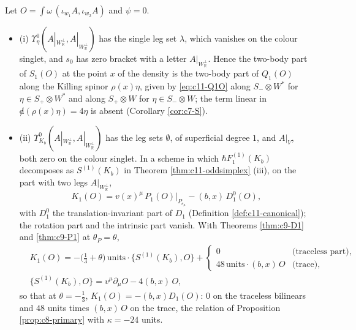 \begin{proposition}
\label{prop:c11-SKbil}
Let $O=\int\omega\,(\iota_{w_1}A,\iota_{w_2}A)$ and $\psi=0$.
\begin{itemize}
\item (i) $\Upsilon^0_\eta(A|_{W_{\mathbb R}^\perp},A|_{W_{\mathbb R}^\perp})$ has the single leg set $\lambda$, which vanishes on the colour singlet, and $s_0$ has zero bracket with a letter $A|_{W_{\mathbb R}^\perp}$. Hence the two-body part of $S_1(O)$ at the point $x$ of the density is the two-body part of $Q_1(O)$ along the Killing spinor $\rho(x)\eta$, given by \eqref{eq:c11-Q1O} along $S_-\otimes W^*$ for $\eta\in S_+\otimes W^*$ and along $S_+\otimes W$ for $\eta\in S_-\otimes W$; the term linear in ${\not d}(\rho(x)\eta)=4\eta$ is absent (Corollary \ref{cor:c7-S}).
\item (ii) $\Upsilon^0_{K_b}(A|_{W_{\mathbb R}^\perp},A|_{W_{\mathbb R}^\perp})$ has the leg sets $\emptyset$, of superficial degree $1$, and $A|_V$, both zero on the colour singlet. In a scheme in which $\hbar F_1^{(1)}(K_b)$ decomposes as $S^{(1)}(K_b)$ in Theorem \ref{thm:c11-oddsimplex} (iii), on the part with two legs $A|_{W_{\mathbb R}^\perp}$,
\[
K_1(O)=v(x)^\mu\,P_1(O)\big|_{P_{e_\mu}}-(b,x)\,D^0_1(O),
\]
with $D^0_1$ the translation-invariant part of $D_1$ (Definition \ref{def:c11-canonical}); the rotation part and the intrinsic part vanish. With Theorems \ref{thm:c9-D1} and \ref{thm:c9-P1} at $\theta_P=\theta$,
\[
\begin{aligned}
&K_1(O)=-\big(\tfrac13+\theta\big)\,\text{units}\cdot\{S^{(1)}(K_b),O\}+\begin{cases}0&\text{(traceless part)},\\ 48\,\text{units}\cdot(b,x)\,O&\text{(trace)},\end{cases}\\
&\{S^{(1)}(K_b),O\}=v^\mu\partial_\mu O-4(b,x)\,O,
\end{aligned}
\]
so that at $\theta=-\tfrac13$, $K_1(O)=-(b,x)D_1(O)$: $0$ on the traceless bilinears and $48$ units times $(b,x)\,O$ on the trace, the relation of Proposition \ref{prop:c8-primary} with $\kappa=-24$ units.
\end{itemize}
\end{proposition}

